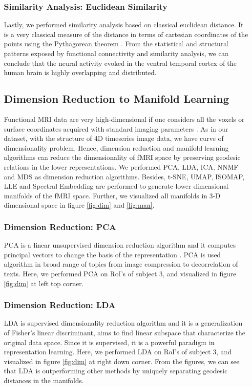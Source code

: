 \documentclass[10pt, twocolumn, letterpaper]{article}
\begin{document}
\subsubsection{Similarity Analysis: Euclidean Similarity}
Lastly, we performed similarity analysis based on classical euclidean distance. It is a very classical measure of the distance in terms of cartesian coordinates of the points using the Pythagorean theorem \cite{maor2019pythagorean}. From the statistical and structural patterns exposed by functional connectivity and similarity analysis, we can conclude that the neural activity evoked in the ventral temporal cortex of the human brain is highly overlapping and distributed.  

\subsection{Dimension Reduction to Manifold Learning}
Functional MRI data are very high-dimensional if one considers all the voxels or surface coordinates acquired with standard imaging parameters \cite{venkatesh2019brain}. As in our dataset, with the structure of 4D timeseries image data, we have curve of dimensionality problem. Hence, dimension reduction and manifold learning algorithms can reduce the dimensionality of fMRI space by preserving geodesic relations in the lower representations. We performed PCA, LDA, ICA, NNMF and MDS as dimension reduction algorithms. Besides, t-SNE, UMAP, ISOMAP, LLE and Spectral Embedding are performed to generate lower dimensional manifolds of the fMRI space. Further, we visualized all manifolds in 3-D dimensional space in figure \ref{fig:dim} and \ref{fig:man}.

\subsubsection{Dimension Reduction: PCA}
PCA is a linear unsupervised dimension reduction algorithm and it computes principal vectors to change the basis of the representation \cite{wold1987principal}. PCA is used algorithm in broad range of topics from image compression to decorrelation of texts. Here, we performed PCA on RoI's of subject 3, and visualized in figure \ref{fig:dim} at left top corner. 


\subsubsection{Dimension Reduction: LDA}
LDA is supervised dimensionality reduction algorithm and it is a generalization of Fisher's linear discriminant, aims to find linear subspace that characterize the original data space. Since it is supervised, it is a powerful paradigm in representation learning. Here, we performed LDA on RoI's of subject 3, and visualized in figure \ref{fig:dim} at right down corner. From the figures, we can see that LDA is outperforming other methods by uniquely separating geodesic distances in the manifolds.     
\end{document}
